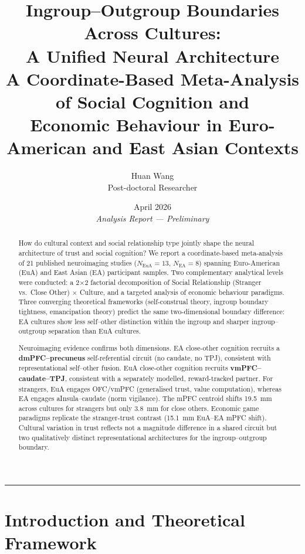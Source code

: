 \documentclass[11pt,a4paper]{report}
\title{\textbf{Ingroup--Outgroup Boundaries Across Cultures:\\[0.2em]
A Unified Neural Architecture}\\[0.6em]
\large A Coordinate-Based Meta-Analysis of Social Cognition and\\
Economic Behaviour in Euro-American and East Asian Contexts}
\author{Huan Wang \\ \small Post-doctoral Researcher}
\date{April 2026 \\ \small\textit{Analysis Report --- Preliminary}}
\begin{document}

\maketitle\thispagestyle{fancy}

\begin{abstract}
\noindent
How do cultural context and social relationship type jointly shape the neural architecture
of trust and social cognition? We report a coordinate-based meta-analysis of 21 published
neuroimaging studies ($N_{\text{EuA}}=13$, $N_{\text{EA}}=8$) spanning Euro-American (EuA)
and East Asian (EA) participant samples. Two complementary analytical levels were conducted:
a 2$\times$2 factorial decomposition of Social Relationship (Stranger vs.\ Close Other)
$\times$ Culture, and a targeted analysis of economic behaviour paradigms. Three converging
theoretical frameworks (self-construal theory, ingroup boundary tightness, emancipation theory)
predict the same two-dimensional boundary difference: EA cultures show less self--other
distinction within the ingroup and sharper ingroup--outgroup separation than EuA cultures.

Neuroimaging evidence confirms both dimensions. EA close-other cognition recruits a
\textbf{dmPFC--precuneus} self-referential circuit (no caudate, no TPJ), consistent with
representational self--other fusion. EuA close-other cognition recruits \textbf{vmPFC--caudate--TPJ},
consistent with a separately modelled, reward-tracked partner. For strangers, EuA engages
OFC/vmPFC (generalised trust, value computation), whereas EA engages aInsula--caudate (norm
vigilance). The mPFC centroid shifts 19.5~mm across cultures for strangers but only 3.8~mm
for close others. Economic game paradigms replicate the stranger-trust contrast (15.1~mm
EuA--EA mPFC shift). Cultural variation in trust reflects not a magnitude difference in a
shared circuit but two qualitatively distinct representational architectures for the
ingroup--outgroup boundary.
\end{abstract}

\tableofcontents
\bigskip\hrule\bigskip

\chapter{Introduction and Theoretical Framework}
\end{document}
